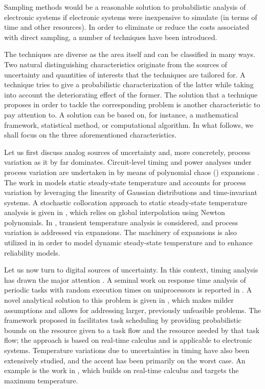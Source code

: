 Sampling methods would be a reasonable solution to probabilistic analysis of
electronic systems if electronic systems were inexpensive to simulate (in terms
of time and other resources). In order to eliminate or reduce the costs
associated with direct sampling, a number of techniques have been introduced.

The techniques are diverse as the area itself and can be classified in many
ways. Two natural distinguishing characteristics originate from the sources of
uncertainty and quantities of interests that the techniques are tailored for. A
technique tries to give a probabilistic characterization of the latter while
taking into account the deteriorating effect of the former. The solution that a
technique proposes in order to tackle the corresponding problem is another
characteristic to pay attention to. A solution can be based on, for instance, a
mathematical framework, statistical method, or computational algorithm. In what
follows, we shall focus on the three aforementioned characteristics.

Let us first discuss analog sources of uncertainty and, more concretely, process
variation as it by far dominates. Circuit-level timing and power analyses under
process variation are undertaken in \cite{bhardwaj2008} by means of polynomial
chaos () expansions \cite{xiu2010}. The work in \cite{juan2012} models
static steady-state temperature and accounts for process variation by leveraging
the linearity of Gaussian distributions and time-invariant systems. A stochastic
collocation \cite{xiu2010} approach to static steady-state temperature analysis
is given in \cite{lee2013}, which relies on global interpolation using Newton
polynomials. In \cite{ukhov2014}, transient temperature analysis is considered,
and process variation is addressed via  expansions. The machinery of
 expansions is also utilized in \cite{ukhov2015} in order to model
dynamic steady-state temperature \cite{ukhov2012} and to enhance reliability
models.

Let us now turn to digital sources of uncertainty. In this context, timing
analysis has drawn the major attention \cite{quinton2012}. A seminal work on
response time analysis of periodic tasks with random execution times on
uniprocessors is reported in \cite{diaz2002}. A novel analytical solution to
this problem is given in \cite{tanasa2015}, which makes milder assumptions and
allows for addressing larger, previously unfeasible problems. The framework
proposed in \cite{santinelli2011} facilitates task scheduling by providing
probabilistic bounds on the resource given to a task flow and the resource
needed by that task flow; the approach is based on real-time calculus and is
applicable to electronic systems. Temperature variations due to uncertainties in
timing have also been extensively studied, and the accent has been primarily on
the worst case. An example is the work in \cite{yang2013}, which builds on
real-time calculus and targets the maximum temperature.


